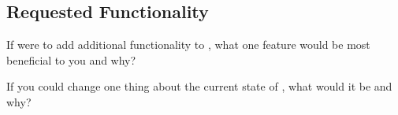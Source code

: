 
\subsection{Requested Functionality}

\begin{question}
If \tc{} were to add additional functionality to \cry,
what one feature would be most beneficial to you and why?
\end{question}

\begin{question}
If you could change one thing about the current state of
\cry, what would it be and why?
\end{question}
